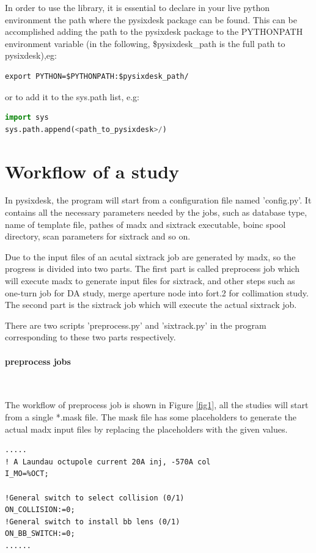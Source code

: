 In order to use the library, it is essential to declare in your live python environment the path where the pysixdesk package can be found. This can be accomplished adding the path to the pysixdesk package to the PYTHONPATH environment variable (in the following, \$pysixdesk\_path is the full path to pysixdesk),eg:

\begin{lstlisting}
export PYTHON=$PYTHONPATH:$pysixdesk_path/
\end{lstlisting}

or to add it to the sys.path list, e.g:

\begin{lstlisting}[language=Python]
import sys
sys.path.append(<path_to_pysixdesk>/)
\end{lstlisting}

\section{Workflow of a study}

In pysixdesk, the program will start from a configuration file named 'config.py'. It contains all the necessary parameters needed by the jobs, such as database type, name of template file, pathes of madx and sixtrack executable, boinc spool directory, scan parameters for sixtrack and so on.

Due to the input files of an acutal sixtrack job are generated by madx, so the progress is divided into two parts. The first part is called preprocess job which will execute madx to generate input files for sixtrack, and other steps such as one-turn job for DA study, merge aperture node into fort.2 for collimation study. The second part is the sixtrack job which will execute the actual sixtrack job.

There are two scripts 'preprocess.py' and 'sixtrack.py' in the program corresponding to these two parts respectively.
\paragraph{preprocess jobs}~

The workflow of preprocess job is shown in Figure \ref{fig1}, all the studies will start from a single *.mask file. The mask file has some placeholders to generate the actual madx input files by replacing the placeholders with the given values.
\begin{lstlisting}
.....
! A Laundau octupole current 20A inj, -570A col
I_MO=%OCT;

!General switch to select collision (0/1)
ON_COLLISION:=0;
!General switch to install bb lens (0/1)
ON_BB_SWITCH:=0;
......
\end{lstlisting}

